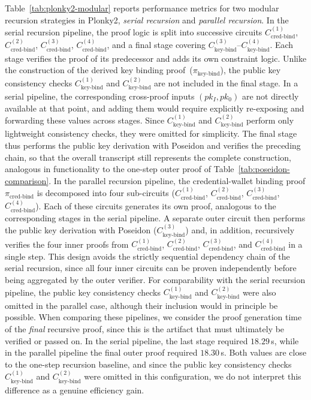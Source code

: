 Table~\ref{tab:plonky2-modular} reports performance metrics for two modular recursion strategies in Plonky2, \emph{serial recursion} and \emph{parallel recursion}. In the serial recursion pipeline, the proof logic is split into successive circuits $C_{\text{cred-bind}}^{(1)}$, $C_{\text{cred-bind}}^{(2)}$, $C_{\text{cred-bind}}^{(3)}$, $C_{\text{cred-bind}}^{(4)}$, and a final stage covering $C_{\text{key-bind}}^{(3)}$--$C_{\text{key-bind}}^{(4)}$. Each stage verifies the proof of its predecessor and adds its own constraint logic. Unlike the construction of the derived key binding proof~($\pi_{\text{key-bind}}$), the public key consistency checks $C_{\text{key-bind}}^{(1)}$ and $C_{\text{key-bind}}^{(2)}$ are not included in the final stage. In a serial pipeline, the corresponding cross-proof inputs $(pk_I, pk_0)$ are not directly available at that point, and adding them would require explicitly re-exposing and forwarding these values across stages. Since $C_{\text{key-bind}}^{(1)}$ and $C_{\text{key-bind}}^{(2)}$ perform only lightweight consistency checks, they were omitted for simplicity. The final stage thus performs the public key derivation with Poseidon and verifies the preceding chain, so that the overall transcript still represents the complete construction, analogous in functionality to the one-step outer proof of Table~\ref{tab:poseidon-comparison}. In the parallel recursion pipeline, the credential-wallet binding proof $\pi_{\text{cred-bind}}$ is decomposed into four sub-circuits ($C_{\text{cred-bind}}^{(1)}$, $C_{\text{cred-bind}}^{(2)}$, $C_{\text{cred-bind}}^{(3)}$, $C_{\text{cred-bind}}^{(4)}$). Each of these circuits generates its own proof, analogous to the corresponding stages in the serial pipeline. A separate outer circuit then performs the public key derivation with Poseidon ($C_{\text{key-bind}}^{(3)}$) and, in addition, recursively verifies the four inner proofs from $C_{\text{cred-bind}}^{(1)}$, $C_{\text{cred-bind}}^{(2)}$, $C_{\text{cred-bind}}^{(3)}$, and $C_{\text{cred-bind}}^{(4)}$ in a single step. This design avoids the strictly sequential dependency chain of the serial recursion, since all four inner circuits can be proven independently before being aggregated by the outer verifier. For comparability with the serial recursion pipeline, the public key consistency checks $C_{\text{key-bind}}^{(1)}$ and $C_{\text{key-bind}}^{(2)}$ were also omitted in the parallel case, although their inclusion would in principle be possible. When comparing these pipelines, we consider the proof generation time of the \emph{final} recursive proof, since this is the artifact that must ultimately be verified or passed on. In the serial pipeline, the last stage required $18.29$\,s, while in the parallel pipeline the final outer proof required $18.30$\,s. Both values are close to the one-step recursion baseline, and since the public key consistency checks $C_{\text{key-bind}}^{(1)}$ and $C_{\text{key-bind}}^{(2)}$ were omitted in this configuration, we do not interpret this difference as a genuine efficiency gain.


